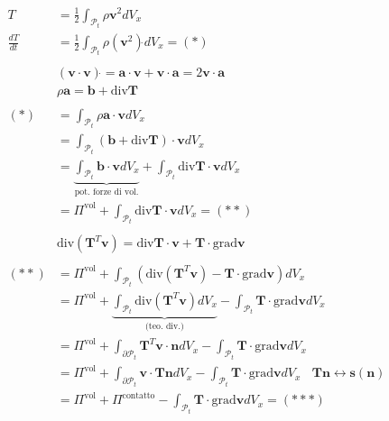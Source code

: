 \documentclass[10pt,a4paper,twoside]{book}
\begin{document}
\begin{align*}
T & =\frac{1}{2}\int _{\mathcal{P}_{t}} \rho \mathbf{v}^{2} dV_{x}\\
\frac{dT}{dt} & =\frac{1}{2}\int _{\mathcal{P}_{t}} \rho \left(\mathbf{v}^{2}\right)\dot{} dV_{x} =( *)\\
 & \\
 & (\mathbf{v} \cdotp \mathbf{v})\dot{} =\mathbf{a} \cdotp \mathbf{v} +\mathbf{v} \cdotp \mathbf{a} =2\mathbf{v} \cdotp \mathbf{a}\\
 & \rho \mathbf{a} =\mathbf{b} +\mathrm{div}\mathbf{T}\\
 & \\
( *) & =\int _{\mathcal{P}_{t}} \rho \mathbf{a} \cdotp \mathbf{v} dV_{x}\\
 & =\int _{\mathcal{P}_{t}}(\mathbf{b} +\mathrm{div}\mathbf{T}) \cdotp \mathbf{v} dV_{x}\\
 & =\underbrace{\int _{\mathcal{P}_{t}}\mathbf{b} \cdotp \mathbf{v} dV_{x}}_{\text{pot. forze di vol.}} +\int _{\mathcal{P}_{t}}\mathrm{div}\mathbf{T} \cdotp \mathbf{v} dV_{x}\\
 & =\Pi ^{\text{vol}} +\int _{\mathcal{P}_{t}}\mathrm{div}\mathbf{T} \cdotp \mathbf{v} dV_{x} =( **)\\
 & \\
 & \mathrm{div}\left(\mathbf{T}^{T}\mathbf{v}\right) =\mathrm{div}\mathbf{T} \cdotp \mathbf{v} +\mathbf{T} \cdotp \mathrm{grad}\mathbf{v}\\
 & \\
( **) & =\Pi ^{\text{vol}} +\int _{\mathcal{P}_{t}}\left(\mathrm{div}\left(\mathbf{T}^{T}\mathbf{v}\right) -\mathbf{T} \cdotp \mathrm{grad}\mathbf{v}\right) dV_{x}\\
 & =\Pi ^{\text{vol}} +\underbrace{\int _{\mathcal{P}_{t}}\mathrm{div}\left(\mathbf{T}^{T}\mathbf{v}\right) dV_{x}}_{\text{(teo. div.)}} -\int _{\mathcal{P}_{t}}\mathbf{T} \cdotp \mathrm{grad}\mathbf{v} dV_{x}\\
 & =\Pi ^{\text{vol}} +\int _{\partial \mathcal{P}_{t}}\mathbf{T}^{T}\mathbf{v} \cdotp \mathbf{n} dV_{x} -\int _{\mathcal{P}_{t}}\mathbf{T} \cdotp \mathrm{grad}\mathbf{v} dV_{x}\\
 & =\Pi ^{\text{vol}} +\int _{\partial \mathcal{P}_{t}}\mathbf{v} \cdotp \mathbf{Tn} dV_{x} -\int _{\mathcal{P}_{t}}\mathbf{T} \cdotp \mathrm{grad}\mathbf{v} dV_{x} \ \ \ \ \mathbf{Tn} \leftrightarrow \mathbf{s}(\mathbf{n})\\
 & =\Pi ^{\text{vol}} +\Pi ^{\text{contatto}} -\int _{\mathcal{P}_{t}}\mathbf{T} \cdotp \mathrm{grad}\mathbf{v} dV_{x} =( ***)
\end{align*}
\end{document}
